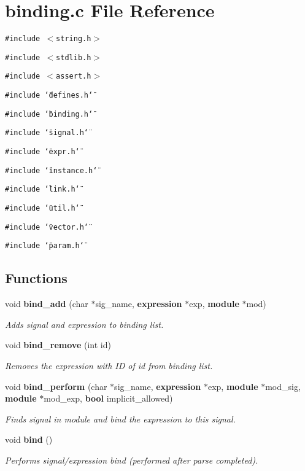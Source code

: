 \section{binding.c File Reference}
\label{binding_8c}
{\tt \#include $<$string.h$>$}\par
{\tt \#include $<$stdlib.h$>$}\par
{\tt \#include $<$assert.h$>$}\par
{\tt \#include \char`\"{}defines.h\char`\"{}}\par
{\tt \#include \char`\"{}binding.h\char`\"{}}\par
{\tt \#include \char`\"{}signal.h\char`\"{}}\par
{\tt \#include \char`\"{}expr.h\char`\"{}}\par
{\tt \#include \char`\"{}instance.h\char`\"{}}\par
{\tt \#include \char`\"{}link.h\char`\"{}}\par
{\tt \#include \char`\"{}util.h\char`\"{}}\par
{\tt \#include \char`\"{}vector.h\char`\"{}}\par
{\tt \#include \char`\"{}param.h\char`\"{}}\par
\subsection*{Functions}
\begin{CompactItemize}
\item 
void {\bf bind\_\-add} (char $\ast$sig\_\-name, {\bf expression} $\ast$exp, {\bf module} $\ast$mod)
\begin{CompactList}\small\item\em Adds signal and expression to binding list.\item\end{CompactList}\item 
void {\bf bind\_\-remove} (int id)
\begin{CompactList}\small\item\em Removes the expression with ID of id from binding list.\item\end{CompactList}\item 
void {\bf bind\_\-perform} (char $\ast$sig\_\-name, {\bf expression} $\ast$exp, {\bf module} $\ast$mod\_\-sig, {\bf module} $\ast$mod\_\-exp, {\bf bool} implicit\_\-allowed)
\begin{CompactList}\small\item\em Finds signal in module and bind the expression to this signal.\item\end{CompactList}\item 
void {\bf bind} ()
\begin{CompactList}\small\item\em Performs signal/expression bind (performed after parse completed).\item\end{CompactList}\end{CompactItemize}

